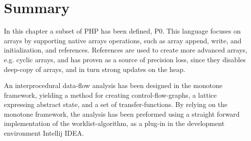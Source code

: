 \section{Summary}

In this chapter a subset of PHP has been defined, P0. This language focuses on arrays by supporting native arrays operations, such as array append, write, and initialization, and references. %
References are used to create more advanced arrays, e.g. cyclic arrays, and has proven as a source of precision loss, since they disables deep-copy of arrays, and in turn strong updates on the heap. 

An interprocedural data-flow analysis has been designed in the monotone framework, yielding a method for creating control-flow-graphs, a lattice expressing abstract state, and a set of transfer-functions. By relying on the monotone framework, the analysis has been preformed using a straight forward implementation of the worklist-algorithm, as a plug-in in the development environment Intellij IDEA. 

